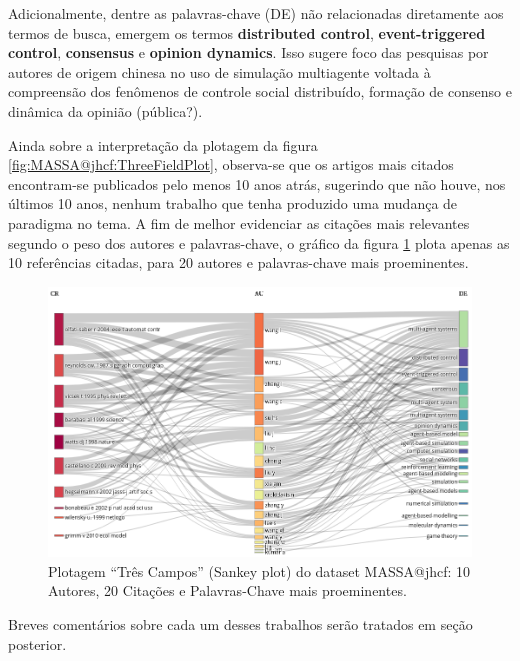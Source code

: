 Adicionalmente, dentre as palavras-chave (DE) não relacionadas diretamente aos termos de busca, emergem os termos \textbf{distributed control}, \textbf{event-triggered control}, \textbf{consensus} e \textbf{opinion dynamics}. Isso sugere foco das pesquisas por autores de origem chinesa no uso de simulação multiagente voltada à compreensão dos fenômenos de controle social distribuído, formação de consenso e dinâmica da opinião (pública?).

Ainda sobre a interpretação da plotagem da figura \ref{fig:MASSA@jhcf:ThreeFieldPlot}, observa-se que os artigos mais citados encontram-se publicados pelo menos 10 anos atrás, sugerindo que não houve, nos últimos 10 anos, nenhum trabalho que tenha produzido uma mudança de paradigma no tema.
A fim de melhor evidenciar as citações mais relevantes segundo o peso dos autores e palavras-chave, o gráfico da figura \ref{fig:MASSA@jhcf:ThreeFieldPlot:10-20-20} plota apenas as 10 referências citadas, para 20 autores e palavras-chave mais proeminentes.

\begin{figure}
    \centering
    \includegraphics[angle=0,width=1\textwidth]{experiments/jhcf/PesqBibliogr/SimulacaoMultiagente/WoS-20210803/classico-mais-citacoes/Dataset/ThreeFieldPlot-AU-CR-DE-20-10-20.png}
    \caption{Plotagem ``Três Campos'' (Sankey plot) do dataset MASSA@jhcf: 10 Autores, 20 Citações e Palavras-Chave mais proeminentes.}
    \label{fig:MASSA@jhcf:ThreeFieldPlot:10-20-20}
\end{figure}

Breves comentários sobre cada um desses trabalhos serão tratados em seção posterior.

